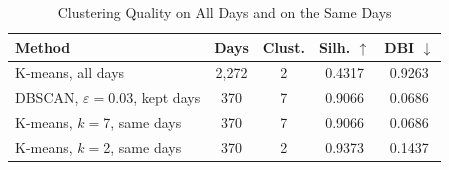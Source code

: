 \begin{table}[!t]
\caption{Clustering Quality on All Days and on the Same Days}
\label{tab:cluster}
\centering
\footnotesize
\setlength{\tabcolsep}{3pt}
\begin{tabular}{lcccc}
\toprule
\textbf{Method} & \textbf{Days} & \textbf{Clust.} & \textbf{Silh.} $\uparrow$ & \textbf{DBI} $\downarrow$ \\
\midrule
K-means{,} all days & 2{,}272 & 2 & 0.4317 & 0.9263 \\
DBSCAN{,} $\varepsilon{=}$0.03{,} kept days & 370 & 7 & 0.9066 & 0.0686 \\
K-means{,} $k{=}$7{,} same days & 370 & 7 & 0.9066 & 0.0686 \\
K-means{,} $k{=}$2{,} same days & 370 & 2 & 0.9373 & 0.1437 \\
\bottomrule
\end{tabular}
\end{table}
